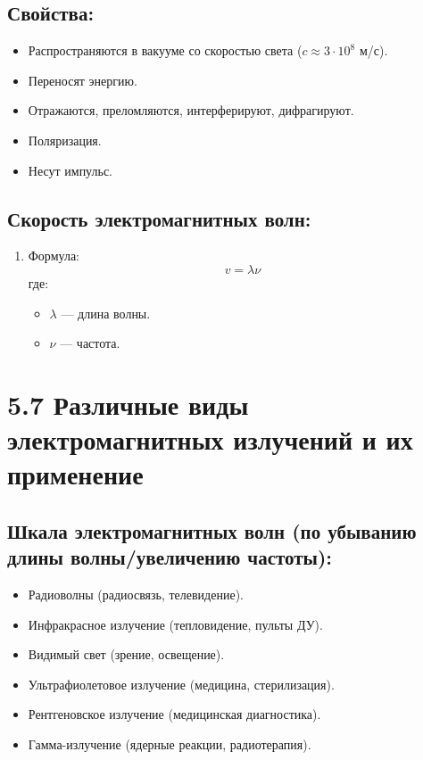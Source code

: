 \documentclass[a4paper,12pt]{article}
\begin{document}
\vspace{-9pt}
\subsection*{Свойства:}
\vspace{-3pt}
\begin{itemize}
  \item Распространяются в вакууме со скоростью света ($c \approx 3 \cdot 10^8$ м/с).
  \item Переносят энергию.
  \item Отражаются, преломляются, интерферируют, дифрагируют.
  \item Поляризация.
  \item Несут импульс.
\end{itemize}

\vspace{-9pt}
\subsection*{Скорость электромагнитных волн:}
\vspace{-3pt}
\begin{enumerate}[itemsep=0pt, topsep=0pt, parsep=3pt]
  \item Формула:
  \vspace{-0.05em}
  $$ v = \lambda \nu $$
  где:
  \begin{itemize}
    \item $\lambda$ — длина волны.
    \item $\nu$ — частота.
  \end{itemize}
\end{enumerate}


\section*{5.7 Различные виды электромагнитных излучений и их применение}
\vspace{-9pt}
\subsection*{Шкала электромагнитных волн (по убыванию длины волны/увеличению частоты):}
\vspace{-3pt}
\begin{itemize}
  \item Радиоволны (радиосвязь, телевидение).
  \item Инфракрасное излучение (тепловидение, пульты ДУ).
  \item Видимый свет (зрение, освещение).
  \item Ультрафиолетовое излучение (медицина, стерилизация).
  \item Рентгеновское излучение (медицинская диагностика).
  \item Гамма-излучение (ядерные реакции, радиотерапия).
\end{itemize}
\end{document}

